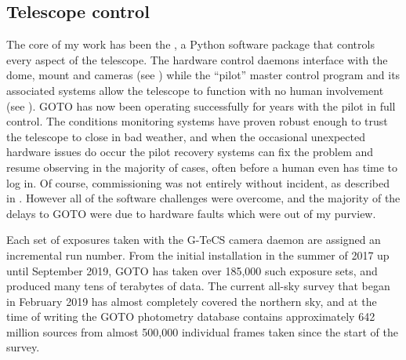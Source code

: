 \subsection{Telescope control}
\label{sec:control_results}
\begin{colsection}

The core of my work has been the , a Python software package that controls every aspect of the telescope. The hardware control daemons interface with the dome, mount and cameras (see ) while the ``pilot'' master control program and its associated systems allow the telescope to function with no human involvement (see ). GOTO has now been operating successfully for years with the pilot in full control. The conditions monitoring systems have proven robust enough to trust the telescope to close in bad weather, and when the occasional unexpected hardware issues do occur the pilot recovery systems can fix the problem and resume observing in the majority of cases, often before a human even has time to log in. Of course, commissioning was not entirely without incident, as described in . However all of the software challenges were overcome, and the majority of the delays to GOTO were due to hardware faults which were out of my purview.

Each set of exposures taken with the G-TeCS camera daemon are assigned an incremental run number. From the initial installation in the summer of 2017 up until September 2019, GOTO has taken over 185,000 such exposure sets, and produced many tens of terabytes of data. The current all-sky survey that began in February 2019 has almost completely covered the northern sky, and at the time of writing the GOTO photometry database contains approximately 642 million sources from almost 500,000 individual frames taken since the start of the survey.

\newpage

\end{colsection}


